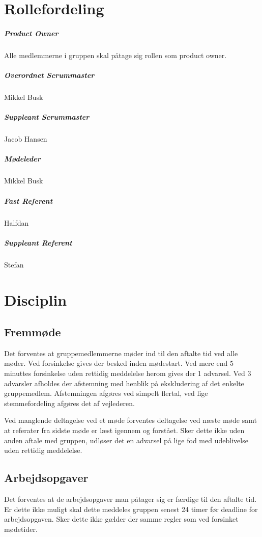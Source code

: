 \documentclass[a4paper,article,11pt,oneside]{memoir}
\begin{document}
\chapter{Rollefordeling}
\paragraph{Product Owner}
Alle medlemmerne i gruppen skal påtage sig rollen som product owner.
\paragraph*{Overordnet Scrummaster} Mikkel Busk
\paragraph*{Suppleant Scrummaster} Jacob Hansen
\paragraph*{Mødeleder}
Mikkel Busk
\paragraph*{Fast Referent}
Halfdan 
\paragraph*{Suppleant Referent}
Stefan
\chapter{Disciplin}
\section{Fremmøde}
Det forventes at gruppemedlemmerne møder ind til den aftalte tid ved alle møder.
Ved forsinkelse gives der besked inden mødestart.  Ved mere end  5 minuttes forsinkelse uden rettidig meddelelse herom gives der 1 advarsel. Ved 3 advarsler afholdes der afstemning med henblik på ekskludering af det enkelte gruppemedlem. Afstemningen afgøres ved simpelt flertal, ved lige stemmefordeling afgøres det af vejlederen.

Ved manglende deltagelse ved et møde forventes deltagelse ved næste møde samt at referater fra sidste møde er læst igennem og forstået. Sker dette ikke uden anden aftale med gruppen, udløser det en advarsel på lige fod med udeblivelse uden rettidig meddelelse.

\section{Arbejdsopgaver}
Det forventes at de arbejdsopgaver man påtager sig er færdige til den aftalte tid. Er dette ikke muligt skal dette meddeles gruppen senest 24 timer før deadline for arbejdsopgaven. Sker dette ikke gælder der samme regler som ved forsinket mødetider.



\end{document}
